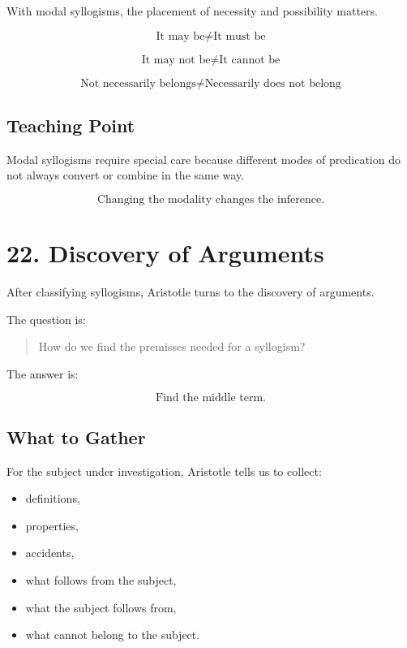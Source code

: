 \documentclass[12pt]{article}
\begin{document}
With modal syllogisms, the placement of necessity and possibility matters.

\[
\text{It may be}
\neq
\text{It must be}
\]

\[
\text{It may not be}
\neq
\text{It cannot be}
\]

\[
\text{Not necessarily belongs}
\neq
\text{Necessarily does not belong}
\]

\subsection*{Teaching Point}

Modal syllogisms require special care because different modes of predication
do not always convert or combine in the same way.

\[
\boxed{
\text{Changing the modality changes the inference.}
}
\]

\section*{22. Discovery of Arguments}

After classifying syllogisms, Aristotle turns to the discovery of arguments.

The question is:

\begin{quote}
How do we find the premisses needed for a syllogism?
\end{quote}

The answer is:

\[
\boxed{
\text{Find the middle term.}
}
\]

\subsection*{What to Gather}

For the subject under investigation, Aristotle tells us to collect:

\begin{itemize}[itemsep=0.25em]
    \item definitions,
    \item properties,
    \item accidents,
    \item what follows from the subject,
    \item what the subject follows from,
    \item what cannot belong to the subject.
\end{itemize}
\end{document}
